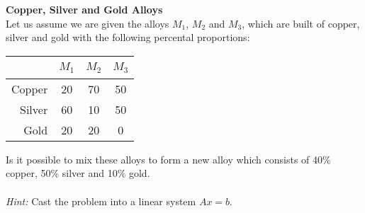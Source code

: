 \textbf{Copper, Silver and Gold Alloys}\\
	Let us assume we are given the alloys $M_1$, $M_2$ and $M_3$, which are built of copper, silver and gold with the following percental proportions:
	\begin{center}
		\begin{tabular}{r|ccc}
			~		&$M_1$ &$M_2$&$M_3$\\
			\hline  
			Copper	&20 &70&50\\
			Silver	&60 &10&50\\	
			Gold	&20 &20&0\\		
		\end{tabular}
	\end{center}
	Is it possible to mix these alloys to form a new alloy which consists of 40\% copper, 50\% silver and 10\% gold.\\~\\
	\textit{Hint: } Cast the problem into a linear system $Ax = b$.